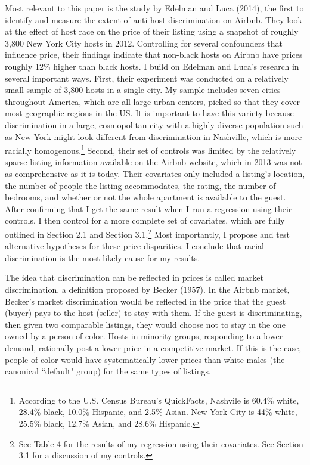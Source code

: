 \documentclass[11pt, oneside]{article}
\begin{document}
Most relevant to this paper is the study by Edelman and Luca (2014), the first to identify and measure the extent of anti-host discrimination on Airbnb.\cite{edelman} They look at the effect of host race on the price of their listing using a snapshot of roughly 3,800 New York City hosts in 2012. Controlling for several confounders that influence price, their findings indicate that non-black hosts on Airbnb have prices roughly 12\% higher than black hosts. I build on Edelman and Luca's research in several important ways. First, their experiment was conducted on a relatively small sample of 3,800 hosts in a single city. My sample includes seven cities throughout America, which are all large urban centers, picked so that they cover most geographic regions in the US. It is important to have this variety because discrimination in a large, cosmopolitan city with a highly diverse population such as New York might look different from discrimination in Nashville, which is more racially homogenous.\footnote{According to the U.S. Census Bureau's QuickFacts, Nashvile is 60.4\% white, 28.4\% black, 10.0\% Hispanic, and 2.5\% Asian. New York City is 44\% white, 25.5\% black, 12.7\% Asian, and 28.6\% Hispanic.} Second, their set of controls was limited by the relatively sparse listing information available on the Airbnb website, which in 2013 was not as comprehensive as it is today. Their covariates only included a listing's location, the number of people the listing accommodates, the rating, the number of bedrooms, and whether or not the whole apartment is available to the guest. After confirming that I get the same result when I run a regression using their controls, I then control for a more complete set of covariates, which are fully outlined in Section 2.1 and Section 3.1.\footnote{See Table 4 for the results of my regression using their covariates. See Section 3.1 for a discussion of my controls.} Most importantly, I propose and test alternative hypotheses for these price disparities. I conclude that racial discrimination is the most likely cause for my results. 




The idea that discrimination can be reflected in prices is called market discrimination, a definition proposed by Becker (1957).\cite{becker} In the Airbnb market, Becker's market discrimination would be reflected in the price that the guest (buyer) pays to the host (seller) to stay with them. If the guest is discriminating, then given two comparable listings, they would choose not to stay in the one owned by a person of color. Hosts in minority groups, responding to a lower demand, rationally post a lower price in a competitive market. If this is the case, people of color would have systematically lower prices than white males (the canonical ``default" group) for the same types of listings. 
\end{document}
